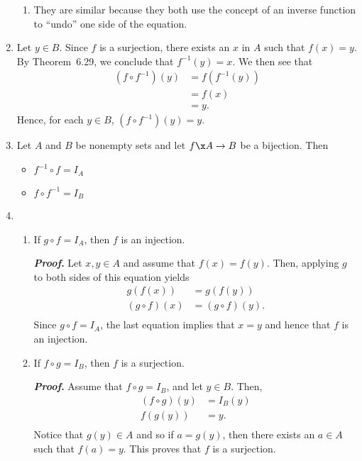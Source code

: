 \begin{enumerate}
\begin{enumerate}
\item They are similar because they both use the concept of an inverse function to ``undo'' one side of the equation.
\end{enumerate}



\item Let $y \in B$.  Since $f$ is a surjection, there exists an $x$ in $A$ such that 
$f(x) = y$.  By Theorem~6.29, we conclude that $f^{-1}(y) = x$.  We then see that 
\begin{align*}
\left( f \circ f^{-1} \right)(y) &= f \left( f^{-1}(y) \right) \\
                                 &= f(x) \\
                                 &= y.
\end{align*}
Hence, for each $y \in B$, $\left( f \circ f^{-1} \right)(y) = y$.


\item Let $A$ and $B$ be nonempty sets and let $f\x A \to B$ be a bijection.  Then
\begin{itemize}
\item $f^{-1} \circ f = I_A$

\item $f \circ f^{-1} = I_B$
\end{itemize}



\item \begin{enumerate}
\item If  $g \circ f = I_A $, then  $f$  is an injection.

\textbf{\emph{Proof}.}  Let $x, y \in A$ and assume that 
$f \left( x \right) = f \left( y \right)$.  Then, applying $g$ to both sides of this equation yields
\[
\begin{aligned}
g \left( f \left( x \right) \right) &= g \left( f \left( y \right) \right) \\
\left( g \circ f \right) \left( x \right) &= \left( g \circ f \right) \left( y \right). \\
\end{aligned}
\]
Since $g \circ f = I_A $, the last equation implies that $x = y$ and hence that $f$ is an injection.

\item If  $f \circ g = I_B $, then  $f$  is a surjection.

\textbf{\emph{Proof}.}  Assume that $f \circ g = I_B $, and let $ y \in B$.  Then,
\[
\begin{aligned}
\left( f \circ g \right) \left( y \right) &= I_B \left( y \right) \\
f \left( g \left( y \right) \right) &= y. \\
\end{aligned}
\]
Notice that $g \left( y \right) \in A$ and so if $a = g \left( y \right)$, then there exists an 
$a \in A$ such that $f \left( a \right) = y$.  This proves that $f$ is a surjection.


\end{enumerate}
\end{enumerate}
